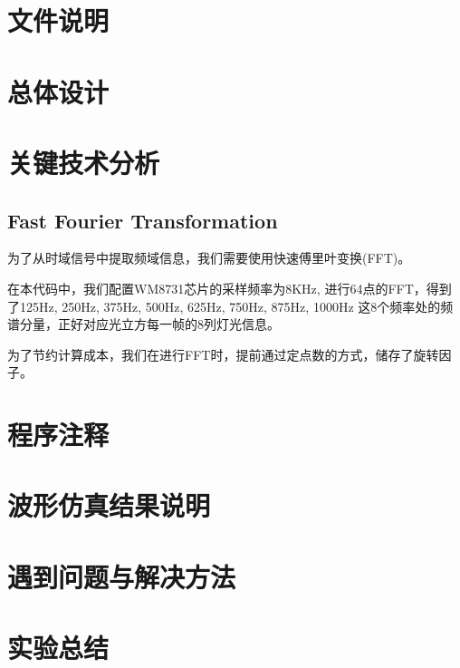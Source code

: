 \documentclass[12pt]{article}
\begin{document}
\section{文件说明}
\section{总体设计}
\section{关键技术分析}
\subsection{Fast Fourier Transformation}
为了从时域信号中提取频域信息，我们需要使用快速傅里叶变换(FFT)。

在本代码中，我们配置WM8731芯片的采样频率为8KHz, 进行64点的FFT，得到了125Hz, 250Hz, 375Hz, 500Hz, 625Hz, 750Hz, 875Hz, 1000Hz
这8个频率处的频谱分量，正好对应光立方每一帧的8列灯光信息。

为了节约计算成本，我们在进行FFT时，提前通过定点数的方式，储存了旋转因子。

\section{程序注释}
\section{波形仿真结果说明}
\section{遇到问题与解决方法}
\section{实验总结}
\end{document}
